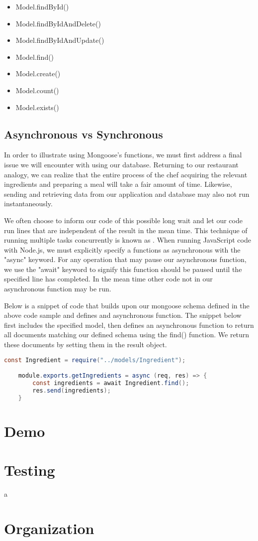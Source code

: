 \begin{itemize}
    \item Model.findById()
    \item Model.findByIdAndDelete()
    \item Model.findByIdAndUpdate()
    \item Model.find()
    \item Model.create()
    \item Model.count()
    \item Model.exists()
\end{itemize}

\subsection*{Asynchronous vs Synchronous}

In order to illustrate using Mongoose's functions, we must first address a final issue we will encounter with using our database. Returning to our restaurant analogy, we can realize that the entire process of the chef acquiring the relevant ingredients and preparing a meal will take a fair amount of time. Likewise, sending and retrieving data from our application and database may also not run instantaneously.

We often choose to inform our code of this possible long wait and let our code run lines that are independent of the result in the mean time. This technique of running multiple tasks concurrently is known as . When running JavaScript code with Node.js, we must explicitly specify a functions as asynchronous with the "async" keyword. For any operation that may pause our asynchronous function, we use the "await" keyword to signify this function should be paused until the specified line has completed. In the mean time other code not in our asynchronous function may be run.

Below is a snippet of code that builds upon our mongoose schema defined in the above code sample and defines and asynchronous function. The snippet below first includes the specified model, then defines an asynchronous function to return all documents matching our defined schema using the find() function. We return these documents by setting them in the result object.

\begin{lstlisting}[language=Java]
    const Ingredient = require("../models/Ingredient");

    module.exports.getIngredients = async (req, res) => {
        const ingredients = await Ingredient.find();
        res.send(ingredients);
    }
\end{lstlisting}
    
\section{Demo}

\section{Testing}a

\section{Organization}
